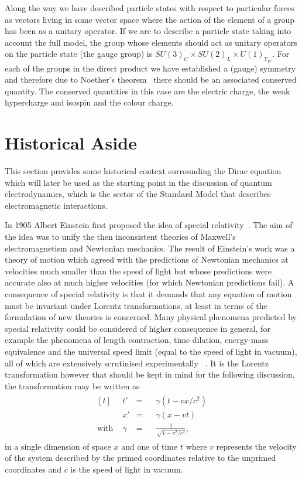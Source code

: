 Along the way we have described particle states with respect to particular
forces as vectors living in some vector space where the action of the element of
a group has been as a unitary operator. If we are to describe a particle state
taking into account the full model, the group whose elements should act as
unitary operators on the particle state (the gauge group) is $SU{(3)}_{C} \times
SU{(2)}_{L} \times U{(1)}_{Y_{W}}$. For each of the groups in the direct product
we have established a (gauge) symmetry and therefore due to Noether's
theorem~\cite{Noether_1971} there should be an associated conserved quantity.
The conserved quantities in this case are the electric charge, the weak
hypercharge and isospin and the colour charge.


\section{Historical Aside}%
\label{sec:history}

This section provides some historical context surrounding the Dirac equation
which will later be used as the starting point in the discussion of quantum
electrodynamics, which is the sector of the Standard Model that describes
electromagnetic interactions.

In 1905 Albert Einstein first proposed the idea of special
relativity~\cite{Einstein:special}. The aim of the idea was to unify the then
inconsistent theories of Maxwell's electromagnetism and Newtonian mechanics. The
result of Einstein's work was a theory of motion which agreed with the
predictions of Newtonian mechanics at velocities much smaller than the speed of
light but whose predictions were accurate also at much higher velocities (for
which Newtonian predictions fail). A consequence of special relativity is that
it demands that any equation of motion must be invariant under Lorentz
transformations, at least in terms of the formulation of new theories is
concerned. Many physical phenomena predicted by special relativity could be
considered of higher consequence in general, for example the phenomena of length
contraction, time dilation, energy-mass equivalence and the universal speed
limit (equal to the speed of light in vacuum), all of which are extensively
scrutinised experimentally ~\cite{sr-tests-1, sr-tests-2, sr-tests-3,
sr-tests-4, sr-tests-5, sr-tests-6, sr-tests-7}. It is the Lorentz
transformation however that should be kept in mind for the following discussion,
the transformation may be written as
\begin{equation}
  \begin{split}
    \begin{aligned}[t] &t'&=&\;\;\;\gamma(t -vx/c^{2})\\ &x'&=&\;\;\;\gamma(x -
vt)\\ \text{with } &\gamma&=&\;\;\;\frac{1}{\sqrt{1 - v^{2}/c^{2}}},
    \end{aligned}
  \end{split}
  \label{eq:lorentz-transform}
\end{equation} in a single dimension of space $x$ and one of time $t$ where $v$
represents the velocity of the system described by the primed coordinates
relative to the unprimed coordinates and $c$ is the speed of light in vacuum.

